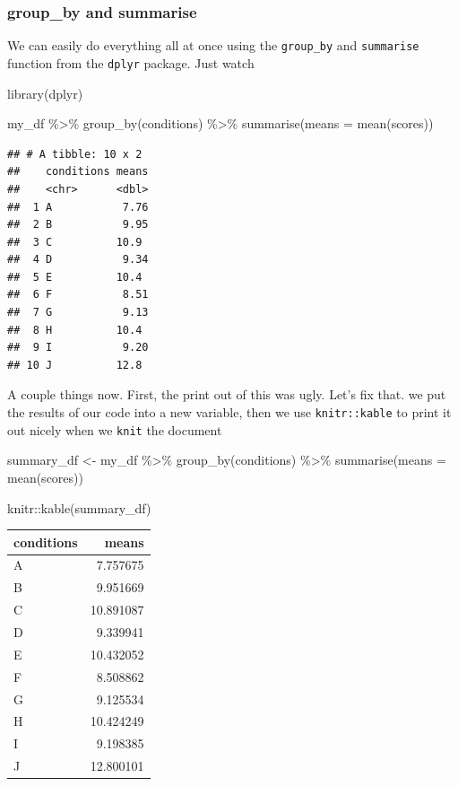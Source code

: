 \documentclass[
]{book}
\newenvironment{Shaded}{\begin{snugshade}}{\end{snugshade}}
\newcommand{\AttributeTok}[1]{\textcolor[rgb]{0.77,0.63,0.00}{#1}}
\newcommand{\FunctionTok}[1]{\textcolor[rgb]{0.00,0.00,0.00}{#1}}
\newcommand{\NormalTok}[1]{#1}
\newcommand{\OtherTok}[1]{\textcolor[rgb]{0.56,0.35,0.01}{#1}}
\newcommand{\SpecialCharTok}[1]{\textcolor[rgb]{0.00,0.00,0.00}{#1}}
\begin{document}
\hypertarget{group_by-and-summarise}{%
\subsubsection{group\_by and summarise}\label{group_by-and-summarise}}

We can easily do everything all at once using the \texttt{group\_by} and \texttt{summarise} function from the \texttt{dplyr} package. Just watch

\begin{Shaded}
\begin{Highlighting}[]
\FunctionTok{library}\NormalTok{(dplyr)}

\NormalTok{my\_df }\SpecialCharTok{\%\textgreater{}\%}
  \FunctionTok{group\_by}\NormalTok{(conditions) }\SpecialCharTok{\%\textgreater{}\%}
  \FunctionTok{summarise}\NormalTok{(}\AttributeTok{means =} \FunctionTok{mean}\NormalTok{(scores))}
\end{Highlighting}
\end{Shaded}

\begin{verbatim}
## # A tibble: 10 x 2
##    conditions means
##    <chr>      <dbl>
##  1 A           7.76
##  2 B           9.95
##  3 C          10.9 
##  4 D           9.34
##  5 E          10.4 
##  6 F           8.51
##  7 G           9.13
##  8 H          10.4 
##  9 I           9.20
## 10 J          12.8
\end{verbatim}

A couple things now. First, the print out of this was ugly. Let's fix that. we put the results of our code into a new variable, then we use \texttt{knitr::kable} to print it out nicely when we \texttt{knit} the document

\begin{Shaded}
\begin{Highlighting}[]
\NormalTok{summary\_df }\OtherTok{\textless{}{-}}\NormalTok{ my\_df }\SpecialCharTok{\%\textgreater{}\%}
               \FunctionTok{group\_by}\NormalTok{(conditions) }\SpecialCharTok{\%\textgreater{}\%}
               \FunctionTok{summarise}\NormalTok{(}\AttributeTok{means =} \FunctionTok{mean}\NormalTok{(scores))}

\NormalTok{knitr}\SpecialCharTok{::}\FunctionTok{kable}\NormalTok{(summary\_df)}
\end{Highlighting}
\end{Shaded}

\begin{tabular}{l|r}
\hline
conditions & means\\
\hline
A & 7.757675\\
\hline
B & 9.951669\\
\hline
C & 10.891087\\
\hline
D & 9.339941\\
\hline
E & 10.432052\\
\hline
F & 8.508862\\
\hline
G & 9.125534\\
\hline
H & 10.424249\\
\hline
I & 9.198385\\
\hline
J & 12.800101\\
\hline
\end{tabular}
\end{document}
